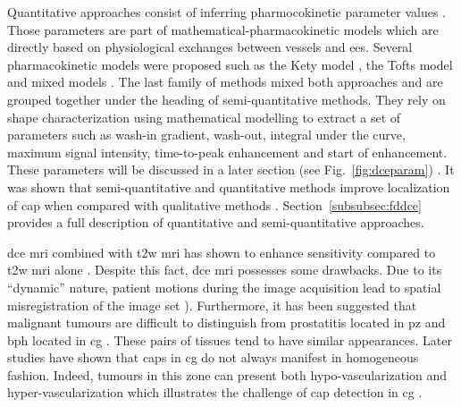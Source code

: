 Quantitative approaches consist of inferring pharmocokinetic parameter values \cite{Tofts2010}.
Those parameters are part of mathematical-pharmacokinetic models which are directly based on physiological exchanges between vessels and \ac{ees}.
Several pharmacokinetic models were proposed such as the Kety model \cite{Kety1951}, the Tofts model \cite{Tofts1997} and mixed models \cite{Larsson1996,StLawrence1998}.
The last family of methods mixed both approaches and are grouped together under the heading of semi-quantitative methods.
They rely on shape characterization using mathematical modelling to extract a set of parameters such as wash-in gradient, wash-out, integral under the curve, maximum signal intensity, time-to-peak enhancement and start of enhancement.
These parameters will be discussed in a later section (see Fig.~\ref{fig:dceparam}) \cite{Hoeks2011,Verma2012}.
It was shown that semi-quantitative and quantitative methods improve localization of \ac{cap} when compared with qualitative methods \cite{Rosenkrantz2013}.
Section~\ref{subsubsec:fddce} provides a full description of quantitative and semi-quantitative approaches.


\ac{dce} \ac{mri} combined with \ac{t2w} \ac{mri} has shown to enhance sensitivity compared to \ac{t2w} \ac{mri} alone \cite{Jager1997,Kim2005,Schlemmer2004,Zelhof2009}.
Despite this fact, \ac{dce} \ac{mri} possesses some drawbacks.
Due to its ``dynamic'' nature, patient motions during the image acquisition lead to spatial misregistration of the image set \cite{Verma2012}).
Furthermore, it has been suggested that malignant tumours are difficult to distinguish from prostatitis located in \ac{pz} and \ac{bph} located in \ac{cg} \cite{Hoeks2011,Verma2012}.
These pairs of tissues tend to have similar appearances. Later studies have shown that \acp{cap} in \ac{cg} do not always manifest in homogeneous fashion.
Indeed, tumours in this zone can present both hypo-vascularization and hyper-vascularization which illustrates the challenge of \ac{cap} detection in \ac{cg} \cite{Niekerk2013}.


